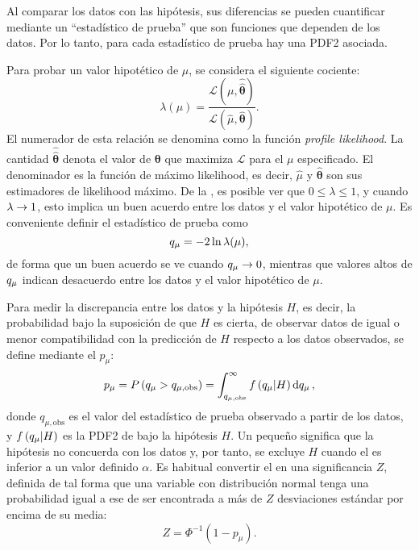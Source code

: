 Al comparar los datos con las hipótesis, sus diferencias se pueden cuantificar mediante un \enquote{estadístico de prueba} que son funciones que dependen de los datos. Por lo tanto, para cada estadístico de prueba hay una \ac{PDF2} asociada.

Para probar un valor hipotético de \(\mu\), se considera el siguiente cociente:
\begin{equation}
    \label{eq:strategy:stat_treatment:hypo_test:lambdamu}
    \lambda(\mu) = \frac{
        \mathcal{L} \left(\mu, \hat{\hat{\bm{\theta}}}\right)
    }{
        \mathcal{L} \left(\hat{\mu}, \hat{\bm{\theta}}\right)
    }.
\end{equation}
El numerador de esta relación se denomina como la función \textit{profile likelihood}. La cantidad \(\hat{\hat{\bm{\theta}}}\) denota el valor de \(\bm{\theta}\) que maximiza \(\mathcal{L}\) para el \(\mu\) especificado. El denominador es la función de máximo likelihood, es decir, \(\hat{\mu}\) y \(\hat{\bm{\theta}}\) son sus estimadores de likelihood máximo.
De la \Eqn{\ref{eq:strategy:stat_treatment:hypo_test:lambdamu}}, es posible ver que \(0 \leq \lambda \leq 1\), y cuando \(\lambda \rightarrow 1\), esto implica un buen acuerdo entre los datos y el valor hipotético de \(\mu\).
Es conveniente definir el estadístico de prueba \qmu como
\begin{equation}
    \label{eq:strategy:stat_treatment:hypo_test:qmu}
    q_{\mu}  = - 2 \ln \lambda(\mu),
\end{equation}
de forma que un buen acuerdo se ve cuando \(q_{\mu} \rightarrow 0\), mientras que valores altos de \(q_{\mu}\) indican desacuerdo entre los datos y el valor hipotético de \(\mu\).


Para medir la discrepancia entre los datos y la hipótesis \(H\), es decir, la probabilidad bajo la suposición de que \(H\) es cierta, de observar datos de igual o menor compatibilidad con la predicción de \(H\) respecto a los datos observados, se define mediante el \pval \(p_{\mu}\):
\begin{equation}
    p_{\mu} = P \left( q_{\mu} > q_{\mu, \text{obs}} \right) = \int_{q_{\mu, \text{obs}}}^{\infty} f \left(q_{\mu} | H\right) \dd{\ensuremath{q_{\mu}}},
\end{equation}
donde \(q_{\mu, \text{obs}}\) es el valor del estadístico de prueba observado a partir de los datos, y \(f\left(q_{\mu} | H\right)\) es la \ac{PDF2} de \qmu bajo la hipótesis \(H\). Un \pval pequeño significa que la hipótesis no concuerda con los datos y, por tanto, se excluye \(H\) cuando el \pval es inferior a un valor definido \(\alpha\).
Es habitual convertir el \pval en una significancia \(Z\), definida de tal forma que una variable con distribución normal tenga una probabilidad igual a ese \pval de ser encontrada a más de \(Z\) desviaciones estándar por encima de su media:
\begin{equation}
    Z = \Phi^{-1} \left(1 - p_{\mu}\right).
\end{equation}

